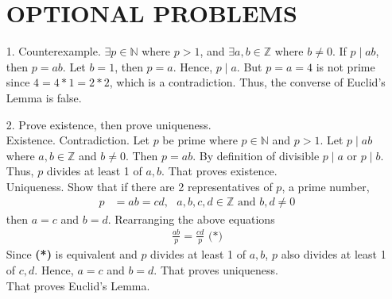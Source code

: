 \documentclass[11pt]{exam}
\begin{document}
\begin{enumerate}[leftmargin=0pt]
\section{OPTIONAL PROBLEMS}

\item[1.] Counterexample. $\exists p \in \mathbb{N}$ where $p > 1$, and $\exists a, b \in \mathbb{Z}$ where $b \neq 0$. If $p \mid ab$, then $ p = ab$. Let $b = 1$, then $p = a$. Hence, $p \mid a$. But $p = a = 4$ is not prime since $4 = 4*1 = 2*2$, which is a contradiction. Thus, the converse of Euclid's Lemma is false.

\item[2.] Prove existence, then prove uniqueness. \\
Existence. Contradiction. Let $p$ be prime where $p \in \mathbb{N}$ and $p > 1$. Let $p \mid ab$ where $a, b \in \mathbb{Z}$ and $b \neq 0$. Then $p = ab$. By definition of divisible $p \mid a$ or $p \mid b$. Thus, $p$ divides at least 1 of $a, b$. That proves existence. \\
Uniqueness. Show that if there are 2 representatives of $p$, a prime number,
\begin{align*}
    p &= ab = cd, \text{ $a, b, c, d \in \mathbb{Z}$ and $b, d \neq 0$}
\end{align*}
then $a = c$ and $b = d$. Rearranging the above equations
\begin{align*}
    \frac{ab}{p} = \frac{cd}{p} \textbf{ (*)}
\end{align*}
Since \textbf{(*)} is equivalent and $p$ divides at least 1 of $a, b$, $p$ also divides at least 1 of $c, d$. Hence, $a = c$ and $b = d$. That proves uniqueness. \\
That proves Euclid's Lemma.

\end{enumerate}
\end{document}
